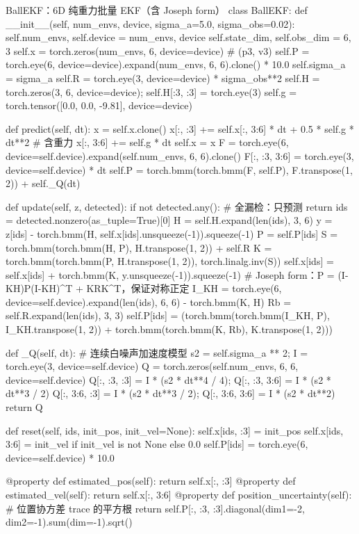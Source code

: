 \begin{codebox}[Python]{BallEKF：6D 纯重力批量 EKF（含 Joseph form）}
class BallEKF:
    def __init__(self, num_envs, device, sigma_a=5.0, sigma_obs=0.02):
        self.num_envs, self.device = num_envs, device
        self.state_dim, self.obs_dim = 6, 3
        self.x = torch.zeros(num_envs, 6, device=device)              # (p3, v3)
        self.P = torch.eye(6, device=device).expand(num_envs, 6, 6).clone() * 10.0
        self.sigma_a = sigma_a
        self.R = torch.eye(3, device=device) * sigma_obs**2
        self.H = torch.zeros(3, 6, device=device); self.H[:3, :3] = torch.eye(3)
        self.g = torch.tensor([0.0, 0.0, -9.81], device=device)

    def predict(self, dt):
        x = self.x.clone()
        x[:, :3] += self.x[:, 3:6] * dt + 0.5 * self.g * dt**2        # 含重力
        x[:, 3:6] += self.g * dt
        self.x = x
        F = torch.eye(6, device=self.device).expand(self.num_envs, 6, 6).clone()
        F[:, :3, 3:6] = torch.eye(3, device=self.device) * dt
        self.P = torch.bmm(torch.bmm(F, self.P), F.transpose(1, 2)) + self._Q(dt)

    def update(self, z, detected):
        if not detected.any():                                       # 全漏检：只预测
            return
        ids = detected.nonzero(as_tuple=True)[0]
        H = self.H.expand(len(ids), 3, 6)
        y = z[ids] - torch.bmm(H, self.x[ids].unsqueeze(-1)).squeeze(-1)
        P = self.P[ids]
        S = torch.bmm(torch.bmm(H, P), H.transpose(1, 2)) + self.R
        K = torch.bmm(torch.bmm(P, H.transpose(1, 2)), torch.linalg.inv(S))
        self.x[ids] = self.x[ids] + torch.bmm(K, y.unsqueeze(-1)).squeeze(-1)
        # Joseph form：P = (I-KH)P(I-KH)^T + KRK^T，保证对称正定
        I_KH = torch.eye(6, device=self.device).expand(len(ids), 6, 6) - torch.bmm(K, H)
        Rb = self.R.expand(len(ids), 3, 3)
        self.P[ids] = (torch.bmm(torch.bmm(I_KH, P), I_KH.transpose(1, 2))
                       + torch.bmm(torch.bmm(K, Rb), K.transpose(1, 2)))

    def _Q(self, dt):       # 连续白噪声加速度模型
        s2 = self.sigma_a ** 2; I = torch.eye(3, device=self.device)
        Q = torch.zeros(self.num_envs, 6, 6, device=self.device)
        Q[:, :3, :3] = I * (s2 * dt**4 / 4); Q[:, :3, 3:6] = I * (s2 * dt**3 / 2)
        Q[:, 3:6, :3] = I * (s2 * dt**3 / 2); Q[:, 3:6, 3:6] = I * (s2 * dt**2)
        return Q

    def reset(self, ids, init_pos, init_vel=None):
        self.x[ids, :3] = init_pos
        self.x[ids, 3:6] = init_vel if init_vel is not None else 0.0
        self.P[ids] = torch.eye(6, device=self.device) * 10.0

    @property
    def estimated_pos(self): return self.x[:, :3]
    @property
    def estimated_vel(self): return self.x[:, 3:6]
    @property
    def position_uncertainty(self):     # 位置协方差 trace 的平方根
        return self.P[:, :3, :3].diagonal(dim1=-2, dim2=-1).sum(dim=-1).sqrt()
\end{codebox}

